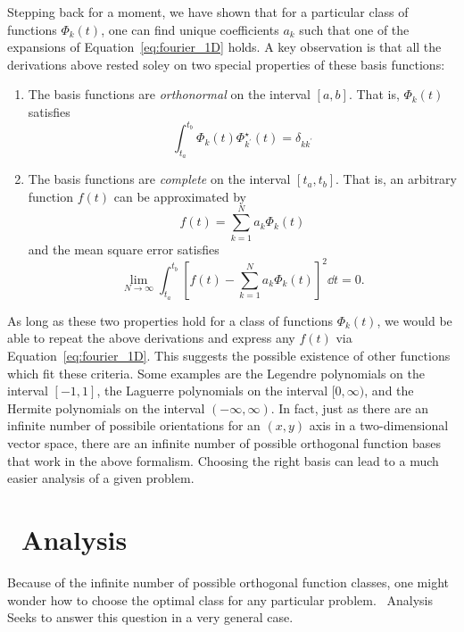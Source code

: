 Stepping back for a moment, we have shown that for a particular
class of functions $\Phi_k(t)$, one can find unique coefficients
$a_k$ such that one of the expansions of Equation~\ref{eq:fourier_1D} holds.
A key observation is that all the derivations above rested 
soley on two special properties of these basis functions:
\begin{enumerate}
  \item
    The basis functions are {\it orthonormal} on the interval $[a, b]$.
    That is, $\Phi_k(t)$ satisfies
    \begin{equation}
      \int_{t_a}^{t_b} \Phi_k(t) \Phi^\star_{k^\prime}(t) = \delta_{kk^\prime}
    \end{equation}
  \item
    The basis functions are {\it complete} on the interval $[t_a, t_b]$.
    That is, an arbitrary function $f(t)$ can be approximated by
    \begin{equation}
      f(t) = \sum_{k=1}^N a_k \Phi_k(t)
    \end{equation}
    and the mean square error satisfies
    \begin{equation}
      \label{eq:completeness}
      \lim_{N\to\infty} \int_{t_a}^{t_b}
      \left[f(t) - \sum_{k=1}^{N}a_k \Phi_k(t)\right]^2 \dd t = 0.
    \end{equation}
\end{enumerate}
As long as these two properties hold for a class of functions $\Phi_k(t)$,
we would be able to repeat the above derivations and express any $f(t)$
via Equation~\ref{eq:fourier_1D}.
This suggests the possible existence of other functions which fit these
criteria.  Some examples are the Legendre polynomials on the interval
$[-1, 1]$, the Laguerre polynomials on the interval $[0, \infty)$, and
the Hermite polynomials on the interval $(-\infty, \infty)$.
In fact, just as there are an infinite number of possibile orientations for
an $(x, y)$ axis in a two-dimensional vector space, there are an infinite
number of possible orthogonal function bases that work in the above
formalism.  Choosing the right basis can lead to a much easier analysis of
a given problem.

\section{\KL\ Analysis}
Because of the infinite number of possible orthogonal function classes,
one might wonder how to choose the optimal class for any particular problem.
\KL\ Analysis Seeks to answer this question in a very general case.


